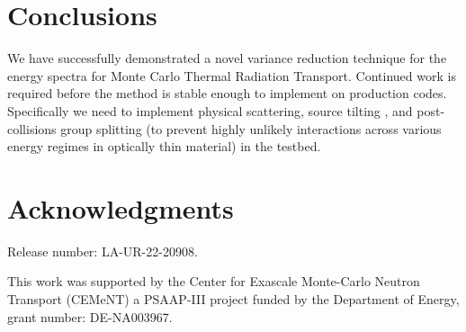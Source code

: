 \section{Conclusions}

We have successfully demonstrated a novel variance reduction technique for the energy spectra for Monte Carlo Thermal Radiation Transport. Continued work is required before the method is stable enough to implement on production codes. Specifically we need to implement physical scattering, source tilting \cite{Wollaber2016}, and post-collisions group splitting (to prevent highly unlikely interactions across various energy regimes in optically thin material) in the testbed.


\section*{Acknowledgments}
Release number: LA-UR-22-20908.

This work was supported by the Center for Exascale Monte-Carlo Neutron Transport (CEMeNT) a PSAAP-III project funded by the Department of Energy, grant number: DE-NA003967.


